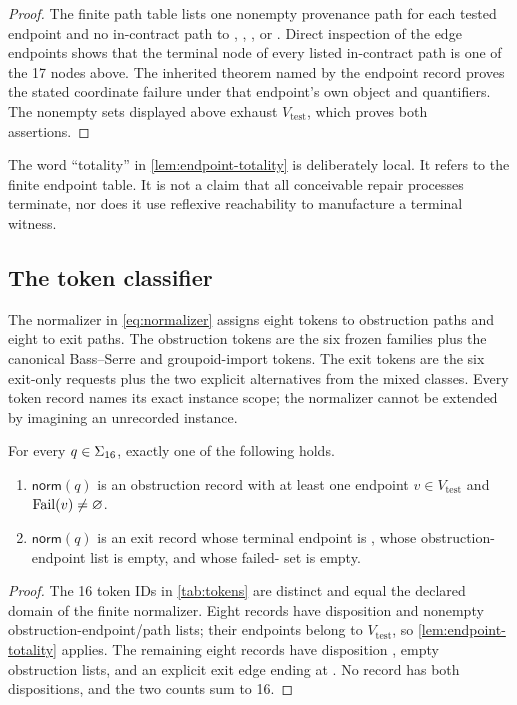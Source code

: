 \begin{proof}
The finite path table lists one nonempty provenance path for each tested
endpoint and no in-contract path to , , , or
.  Direct inspection of the edge endpoints shows that the terminal
node of every listed in-contract path is one of the 17 nodes above.  The
inherited theorem named by the endpoint record proves the stated coordinate
failure under that endpoint's own object and quantifiers.  The nonempty sets
displayed above exhaust $V_{\mathrm{test}}$, which proves both assertions.
\end{proof}

The word ``totality'' in \cref{lem:endpoint-totality} is deliberately local.
It refers to the finite endpoint table.  It is not a claim that all conceivable
repair processes terminate, nor does it use reflexive reachability to manufacture
a terminal witness.

\subsection{The token classifier}

The normalizer in \cref{eq:normalizer} assigns eight tokens to obstruction
paths and eight to exit paths.  The obstruction tokens are the six frozen
families plus the canonical Bass--Serre and groupoid-import tokens.  The exit
tokens are the six exit-only requests plus the two explicit alternatives from
the mixed classes.  Every token record names its exact instance scope; the
normalizer cannot be extended by imagining an unrecorded instance.

\begin{proposition}
\label{prop:token-totality}
For every $q\in\Sigma_{16}$, exactly one of the following holds.
\begin{enumerate}
  \item $\mathsf{norm}(q)$ is an obstruction record with at least one endpoint
  $v\in V_{\mathrm{test}}$ and $\operatorname{Fail}(v)\ne\varnothing$.
  \item $\mathsf{norm}(q)$ is an exit record whose terminal endpoint is
  , whose obstruction-endpoint list is empty, and whose failed-\Good{}
  set is empty.
\end{enumerate}
\end{proposition}

\begin{proof}
The 16 token IDs in \cref{tab:tokens} are distinct and equal the declared
domain of the finite normalizer.  Eight records have disposition
\Obstructed{} and nonempty obstruction-endpoint/path lists; their endpoints
belong to $V_{\mathrm{test}}$, so \cref{lem:endpoint-totality} applies.  The
remaining eight records have disposition \Exit{}, empty obstruction lists, and
an explicit exit edge ending at .  No record has both dispositions,
and the two counts sum to 16.
\end{proof}

